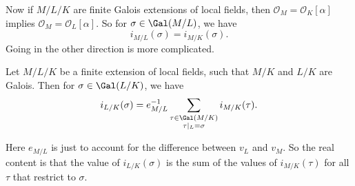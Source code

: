 \documentclass[a4paper]{article}
\begin{document}
Now if $M/L/K$ are finite Galois extensions of local fields, then $\mathcal{O}_M = \mathcal{O}_K[\alpha]$ implies $\mathcal{O}_M = \mathcal{O}_L[\alpha]$. So for $\sigma \in \Gal(M/L)$, we have
\[
  i_{M/L}(\sigma) = i_{M/K}(\sigma).
\]
Going in the other direction is more complicated.
\begin{prop}
  Let $M/L/K$ be a finite extension of local fields, such that $M/K$ and $L/K$ are Galois. Then for $\sigma \in \Gal(L/K)$, we have
  \[
    i_{L/K}(\sigma) = e_{M/L}^{-1} \sum_{\substack{\tau \in \Gal(M/K)\\ \tau|_L = \sigma}} i_{M/K}(\tau).
  \]
\end{prop}
Here $e_{M/L}$ is just to account for the difference between $v_L$ and $v_M$. So the real content is that the value of $i_{L/K}(\sigma)$ is the sum of the values of $i_{M/K}(\tau)$ for all $\tau$ that restrict to $\sigma$.
\end{document}
